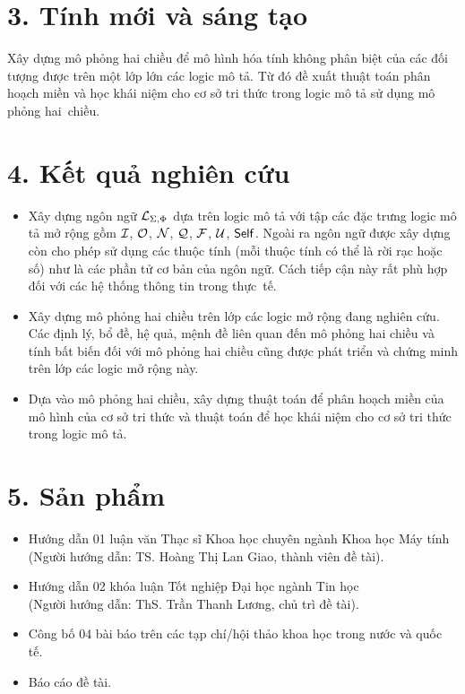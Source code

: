 \section*{3. Tính mới và sáng tạo}
Xây dựng mô phỏng hai chiều để mô hình hóa tính không phân biệt của các đối tượng được trên một lớp lớn các logic mô tả. Từ đó đề xuất thuật toán phân hoạch miền và học khái niệm cho cơ sở tri thức trong logic mô tả sử dụng mô phỏng hai~chiều.

\section*{4. Kết quả nghiên cứu}
\begin{itemize}
	\item Xây dựng ngôn ngữ $\mathcal{L}_{\Sigma,\Phi}$ dựa trên logic mô tả \ALCreg với tập các đặc trưng logic mô tả mở rộng gồm $\mathcal{I}$, $\mathcal{O}$, $\mathcal{N}$, $\mathcal{Q}$, $\mathcal{F}$, $\mathcal{U}$, $\mathsf{Self}$. Ngoài ra ngôn ngữ được xây dựng còn cho phép sử dụng các thuộc tính (mỗi thuộc tính có thể là rời rạc hoặc số) như là các phần tử cơ bản của ngôn ngữ. Cách tiếp cận này rất phù hợp đối với các hệ thống thông tin trong thực~tế.
	
	\item Xây dựng mô phỏng hai chiều trên lớp các logic mở rộng đang nghiên cứu. Các định lý, bổ đề, hệ quả, mệnh đề liên quan đến mô phỏng hai chiều và tính bất biến đối với mô phỏng hai chiều cũng được phát triển và chứng minh trên lớp các logic mở rộng này.
	
	\item Dựa vào mô phỏng hai chiều, xây dựng thuật toán để phân hoạch miền của mô hình của cơ sở tri thức và thuật toán \BBCLearnS để học khái niệm cho cơ sở tri thức trong logic mô tả.
\end{itemize}
\section*{5. Sản phẩm}
\begin{itemize}
	\item Hướng dẫn 01 luận văn Thạc sĩ Khoa học chuyên ngành Khoa học Máy tính\\
	(Người hướng dẫn: TS. Hoàng Thị Lan Giao, thành viên đề tài).
	\item Hướng dẫn 02 khóa luận Tốt nghiệp Đại học ngành Tin học\\
	(Người hướng dẫn: ThS. Trần Thanh Lương, chủ trì đề tài).
	\item Công bố 04 bài báo trên các tạp chí/hội thảo khoa học trong nước và quốc tế.
	\item Báo cáo đề tài.
\end{itemize}
